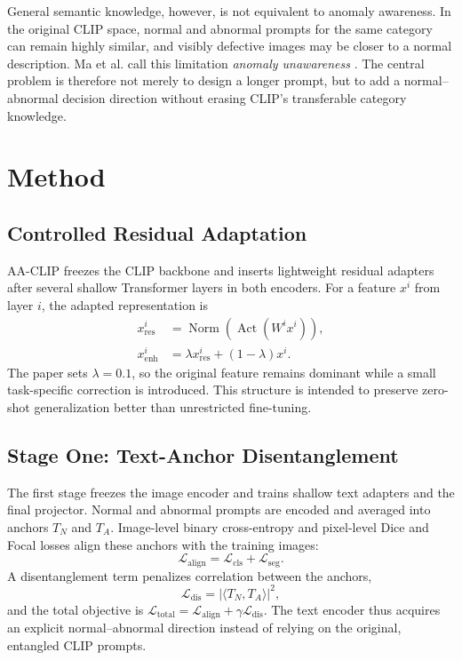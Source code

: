 \documentclass[a4paper,10pt]{article}
\newcommand{\TN}{T_{N}}
\newcommand{\TA}{T_{A}}
\newcommand{\loss}{\mathcal{L}}
\begin{document}
General semantic knowledge, however, is not equivalent to anomaly awareness. In the original CLIP space, normal and abnormal prompts for the same category can remain highly similar, and visibly defective images may be closer to a normal description. Ma et al. call this limitation \emph{anomaly unawareness} \cite{ma2025}. The central problem is therefore not merely to design a longer prompt, but to add a normal--abnormal decision direction without erasing CLIP's transferable category knowledge.

\section{Method}

\subsection{Controlled Residual Adaptation}

AA-CLIP freezes the CLIP backbone and inserts lightweight residual adapters after several shallow Transformer layers in both encoders. For a feature $x^i$ from layer $i$, the adapted representation is
\begin{align}
x_{\mathrm{res}}^i &= \operatorname{Norm}\!\left(\operatorname{Act}(W^i x^i)\right), \\
x_{\mathrm{enh}}^i &= \lambda x_{\mathrm{res}}^i+(1-\lambda)x^i .
\end{align}
The paper sets $\lambda=0.1$, so the original feature remains dominant while a small task-specific correction is introduced. This structure is intended to preserve zero-shot generalization better than unrestricted fine-tuning.

\subsection{Stage One: Text-Anchor Disentanglement}

The first stage freezes the image encoder and trains shallow text adapters and the final projector. Normal and abnormal prompts are encoded and averaged into anchors $\TN$ and $\TA$. Image-level binary cross-entropy and pixel-level Dice and Focal losses align these anchors with the training images:
\begin{equation}
\loss_{\mathrm{align}}
=\loss_{\mathrm{cls}}+\loss_{\mathrm{seg}}.
\end{equation}
A disentanglement term penalizes correlation between the anchors,
\begin{equation}
\loss_{\mathrm{dis}}=\left|\langle \TN,\TA\rangle\right|^2,
\end{equation}
and the total objective is $\loss_{\mathrm{total}}=\loss_{\mathrm{align}}+\gamma\loss_{\mathrm{dis}}$. The text encoder thus acquires an explicit normal--abnormal direction instead of relying on the original, entangled CLIP prompts.
\end{document}
